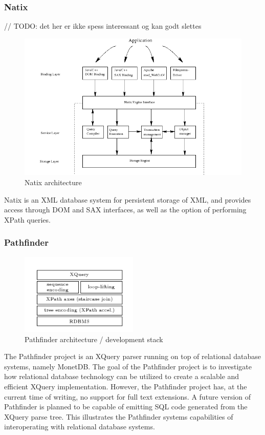 \subsubsection{Natix}
// TODO: det her er ikke spess interessant og kan godt slettes
\begin{figure}[!h]
  \centering
    \includegraphics[width=1\textwidth]{img/natix_architecture.png}
  \caption{Natix architecture}
\end{figure}
Natix is an XML database system for persistent storage of XML, and provides 
access through DOM and SAX interfaces, as well as the option of performing 
XPath queries.

\subsubsection{Pathfinder}
\begin{figure}[!h]
  \centering
    \includegraphics[width=0.5\textwidth]{img/pathfinder_architecture.png}
  \caption{Pathfinder architecture / development stack}
\end{figure}
The Pathfinder project is an XQuery parser running on top of relational
database systems, namely MonetDB. The goal of the Pathfinder project is to
investigate how relational database technology can be utilized to create a
scalable and efficient XQuery implementation. However, the Pathfinder project
has, at the current time of writing, no support for full text extensions. A
future version of Pathfinder is planned to be capable of emitting SQL code
generated from the XQuery parse tree. This illustrates the Pathfinder systems
capabilities of interoperating with relational database systems.

